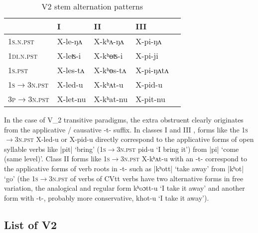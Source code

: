 \documentclass[oneside,a4paper,11pt]{article}
\newcommand{\ipa}[1]{{\phon#1}}
\newcommand{\dhatu}[2]{|\ipa{#1}| `#2'}
\begin{document}
\begin{table}[H] 
\caption{V2 stem alternation patterns} \label{tab:le.khAt.pi} \centering 
\begin{tabular}{lllll} 
\toprule 
&   I  &   II & III  \\
\midrule
\textsc{1s.n.pst} &  \ipa{X-le-ŋʌ} & \ipa{X-kʰʌ-ŋʌ} &  \ipa{X-pi-ŋʌ} \\
\textsc{1di.n.pst} &  \ipa{X-leʦ-i} & \ipa{X-kʰɵʦ-i} & \ipa{X-pi-ji} & \\
\textsc{1s.pst} & \ipa{X-les-tʌ} & \ipa{X-kʰɵs-tʌ} & \ipa{X-pi-ŋʌtʌ} & \\
\hline 
\textsc{1s$\rightarrow$3n.pst} &  \ipa{X-led-u} &  \ipa{X-kʰʌt-u} &  \ipa{X-pid-u}  \\
\textsc{3p$\rightarrow$3n.pst} &    \ipa{X-let-nu} &    \ipa{X-kʰat-nu} & \ipa{X-pit-nu} & \\
\bottomrule 
\end{tabular}
\end{table}

In the case of V_2 transitive paradigms, the extra obstruent clearly originates from the applicative / causative \ipa{-t-} suffix. In classes I and III , forms like the \textsc{1s$\rightarrow$3n.pst} \ipa{X-led-u}  or  \ipa{X-pid-u} directly correspond to the applicative forms of open syllable verbs like \dhatu{pit}{bring} (\textsc{1s$\rightarrow$3n.pst}  \ipa{pid-u} `I bring it') from \dhatu{pi}{come (same level)}. Class II forms like \textsc{1s$\rightarrow$3n.pst}  \ipa{X-kʰʌt-u} with an \ipa{-t-} correspond to the applicative forms of verb roots in \ipa{-t-} such as \dhatu{kʰott}{take away} from \dhatu{kʰot}{go} (the \textsc{1s$\rightarrow$3n.pst} of verbs of \ipa{CVtt} verbs have two alternative forms in free variation, the analogical and regular form \ipa{kʰoɔtt-u} `I take it away' and another form with \ipa{-t-}, probably more conservative, \ipa{khot-u} `I take it away').

\subsection{List of V2}
\end{document}
